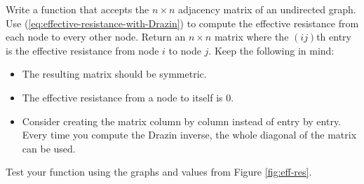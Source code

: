 \begin{problem} %
Write a function that accepts the $n \times n$ adjacency matrix of an undirected graph.
Use (\ref{eq:effective-resistance-with-Drazin}) to compute the effective resistance from each node to every other node.
Return an $n \times n$ matrix where the $(ij)$th entry is the effective resistance from node $i$ to node $j$.
Keep the following in mind: %
\begin{itemize}
\item The resulting matrix should be symmetric.
\item The effective resistance from a node to itself is $0$.
\item Consider creating the matrix column by column instead of entry by entry. Every time you compute the Drazin inverse, the whole diagonal of the matrix can be used.
\end{itemize}
Test your function using the graphs and values from Figure \ref{fig:eff-res}.
\label{prob:effective-resistance}
\end{problem}

